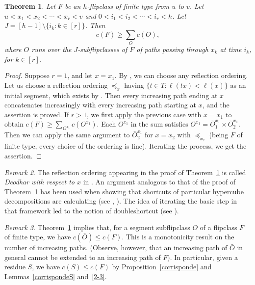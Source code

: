 \documentclass[12pt,reqno]{amsart}
\theoremstyle{plain}
\newtheorem{thm}{Theorem}[section]
\theoremstyle{definition}
\theoremstyle{remark}
\newtheorem{rmk}[thm]{Remark}
\begin{document}
\begin{thm}\label{terni}
Let $F$ be an $h$-flipclass of finite type from $u$ to $v$. Let $u< x_1< x_2 < \cdots < x_r<  v$ and  $0< i_1 < i_2 < \cdots < i_r < h$.  Let $J=[h-1]\setminus \{i_k : k\in [r]\}$. Then
$$c(F) \geq \sum_{O}  c(O),$$
where $O$ runs over the  $J$-subflipclasses of $F$ of paths passing through $x_k$ at time $i_k$, for $k\in[r]$. 
\end{thm}
\begin{proof}
Suppose $r=1$, and let $x=x_1$. By  \cite[Proposition~6.7]{EMS}, we can choose any reflection ordering. Let us choose a reflection ordering $\preceq_x$ having $ \{t \in T : \ell(tx) < \ell(x)\}$ as an initial segment, which exists by \cite[Lemma~2.11]{DyeComp}.  Then every  increasing path ending at $x$ concatenates increasingly with every increasing path starting at $x$, and the assertion is proved.
If $r>1$, we first apply the previous case with $x=x_1$ to obtain $c(F) \geq  \sum_{O^{x_1}}  c(O^{x_1})$. Each $O^{x_1}$ in the sum satisfies  $O^{x_1}=\bar{O}^{x_1}_1 \times \bar{O}^{x_1}_2$. Then we can apply the same argument  to $\bar{O}^{x_1}_2$ for $x=x_2$ with $\preceq_{x_2}$ (being $F$ of finite type, every choice of the ordering is fine). Iterating the process, we get the assertion. 
\end{proof}

\begin{rmk}
The reflection ordering appearing in the proof of Theorem~\ref{terni} is called \emph{Deodhar with respect to $x$} in \cite[Definition~3.3]{BGL}. An argument analogous to that of the proof of Theorem~\ref{terni} has been used when showing that shortcuts of particular hypercube decompositions are calculating (see \cite{B-G}, \cite{B-M}). The idea of iterating the basic step in that framework led to the notion of doubleshortcut (see \cite{EM2}). 
\end{rmk}

\begin{rmk}
\label{cracker}
Theorem~\ref{terni} implies that, for a segment subflipclass $O$ of a flipclass $F$ of finite type, we have $c(\bar{O})\leq c(F)$. This is a monotonicity result on the number of increasing paths. (Observe, however, that  an increasing path of $\bar{O}$ in general cannot be extended to an increasing path of $F$). In particular, given a residue $S$, we have $c(S)\leq c(F)$ by Proposition~\ref{corrisponde} and  Lemmas~\ref{corrispondeS} and~\ref{2-3}. 
\end{rmk}
\end{document}
